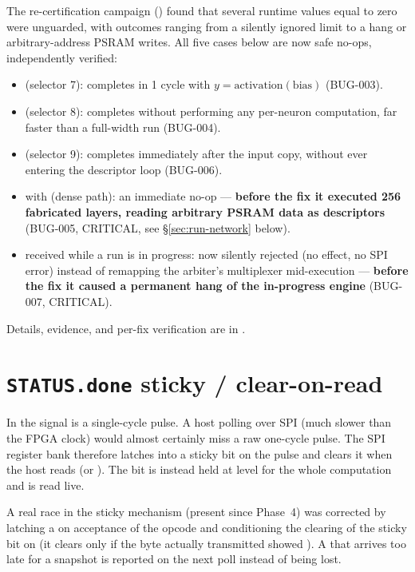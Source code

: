 \begin{fnwarn}[``real=0'' edge cases fixed (2026-09-04)]
The re-certification campaign () found that several
runtime values equal to zero were unguarded, with outcomes ranging from a silently
ignored limit to a hang or arbitrary-address PSRAM writes. All five cases below are now
safe no-ops, independently verified:
\begin{itemize}
\item {} (selector 7): completes in 1 cycle with
$y=\text{activation}(\text{bias})$ (BUG-003).
\item {} (selector 8): completes without performing any
per-neuron computation, far faster than a full-width run (BUG-004).
\item {} (selector 9): completes immediately after the input
copy, without ever entering the descriptor loop (BUG-006).
\item {} with  (dense path): an immediate no-op ---
\textbf{before the fix it executed 256 fabricated layers, reading arbitrary PSRAM data as
descriptors} (BUG-005, CRITICAL, see \S\ref{sec:run-network} below).
\item {} received while a run is in progress: now silently rejected
(no effect, no SPI error) instead of remapping the arbiter's multiplexer mid-execution
--- \textbf{before the fix it caused a permanent hang of the in-progress engine}
(BUG-007, CRITICAL).
\end{itemize}
Details, evidence, and per-fix verification are in .
\end{fnwarn}

\section{\texttt{STATUS.done} sticky / clear-on-read}
In  the  signal is a single-cycle pulse. A host polling
over SPI (much slower than the FPGA clock) would almost certainly miss a raw one-cycle
pulse. The SPI register bank therefore latches  into a sticky bit on the pulse
and clears it when the host reads  (or ). The  bit is
instead held at level for the whole computation and is read live.

\begin{fnwarn}
A real race in the sticky mechanism (present since Phase~4) was corrected by latching a
 on acceptance of the  opcode and conditioning the
clearing of the sticky bit on  (it clears only if the byte
actually transmitted showed ). A  that arrives too late for a
snapshot is reported on the next poll instead of being lost.
\end{fnwarn}

